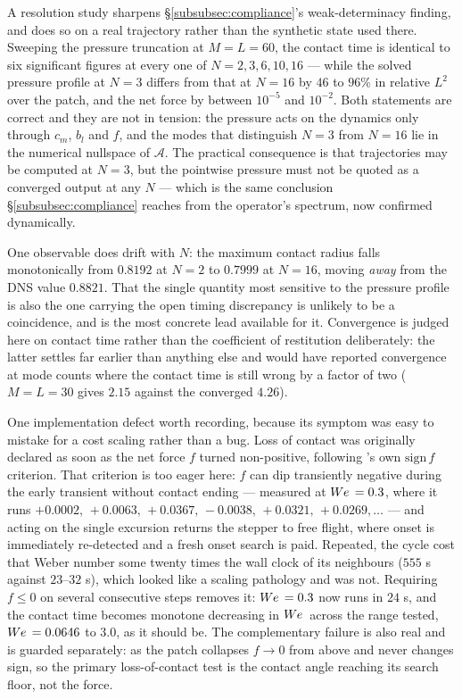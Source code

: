A resolution study sharpens \S\ref{subsubsec:compliance}'s weak-determinacy finding, and
does so on a real trajectory rather than the synthetic state used there. Sweeping the
pressure truncation at $M=L=60$, the contact time is identical to six significant figures
at every one of $N=2,3,6,10,16$ --- while the solved pressure
profile at $N=3$ differs from that at $N=16$ by $46$ to $96\%$ in relative $L^2$ over the
patch, and the net force by between $10^{-5}$ and $10^{-2}$. Both statements are correct
and they are not in tension: the pressure acts on the dynamics only through $c_m$, $b_l$
and $f$, and the modes that distinguish $N=3$ from $N=16$ lie in the numerical nullspace
of $\mathcal A$. The practical consequence is that trajectories may be computed at $N=3$,
but the pointwise pressure must not be quoted as a converged output at any $N$ --- which
is the same conclusion \S\ref{subsubsec:compliance} reaches from the operator's spectrum,
now confirmed dynamically.

One observable does drift with $N$: the maximum contact radius falls monotonically from
$0.8192$ at $N=2$ to $0.7999$ at $N=16$, moving \emph{away} from the DNS value $0.8821$.
That the single quantity most sensitive to the pressure profile is also the one carrying
the open timing discrepancy is unlikely to be a coincidence, and is the most concrete lead
available for it. Convergence is judged here on contact time rather than the coefficient
of restitution deliberately: the latter settles far earlier than anything else and would
have reported convergence at mode counts where the contact time is still wrong by a factor
of two ($M=L=30$ gives $2.15$ against the converged $4.26$).

One implementation defect worth recording, because its symptom was easy to mistake for a
cost scaling rather than a bug. Loss of contact was originally declared as soon as the net
force $f$ turned non-positive, following \cite{AlventosaEtAl2023}'s own $\mathrm{sign}\,f$
criterion. That criterion is too eager here: $f$ can dip transiently negative during the
early transient without contact ending --- measured at $W\kern-0.03em e\,=0.3$, where it runs
$+0.0002,\,+0.0063,\,+0.0367,\,-0.0038,\,+0.0321,\,+0.0269,\dots$ --- and acting on the
single excursion returns the stepper to free flight, where onset is immediately
re-detected and a fresh onset search is paid. Repeated, the cycle cost that Weber number
some twenty times the wall clock of its neighbours ($555$ s against $23$--$32$ s), which
looked like a scaling pathology and was not. Requiring $f\le0$ on several consecutive
steps removes it: $W\kern-0.03em e\,=0.3$ now runs in $24$ s, and the contact time becomes monotone
decreasing in $W\kern-0.03em e\,$ across the range tested, $W\kern-0.03em e\,=0.0646$ to $3.0$, as it should be. The complementary failure is also
real and is guarded separately: as the patch collapses $f\to0$ from above and never
changes sign, so the primary loss-of-contact test is the contact angle reaching its search
floor, not the force.

